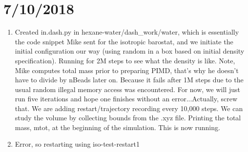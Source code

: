 \documentclass[12pt,reqno]{amsart}
\numberwithin{equation}{section}
\begin{document}
\section{7/10/2018}
\begin{enumerate}
\item Created in.dash.py in hexane-water/dash\_work/water, which is essentially the code snippet Mike sent for the isotropic barostat, and we initiate the initial configuration our way (using random in a box based on initial density specification).  Running for 2M steps to see what the density is like.  Note, Mike computes total mass prior to preparing PIMD, that's why he doesn't have to divide by nBeads later on.  Because it fails after 1M steps due to the usual random illegal memory access was encountered.  For now, we will just run five iterations and hope one finishes without an error...Actually, screw that.  We are adding restart/trajectory recording every 10,000 steps.  We can study the volume by collecting bounds from the .xyz file.  Printing the total mass, mtot, at the beginning of the simulation.  This is now running.  
\item Error, so restarting using iso-test-restart1
\end{enumerate}
\end{document}
